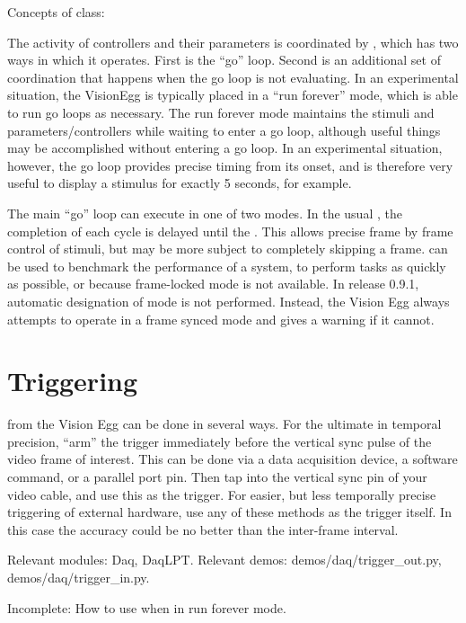 Concepts of  class:

The activity of controllers and their parameters is coordinated by
, which has two ways in which it operates.  First
is the ``go'' loop.  Second is an additional set of coordination that
happens when the go loop is not evaluating. In an experimental
situation, the VisionEgg is typically placed in a ``run forever''
mode, which is able to run go loops as necessary.  The run forever
mode maintains the stimuli and parameters/controllers while waiting to
enter a go loop, although useful things may be accomplished without
entering a go loop.  In an experimental situation, however, the go
loop provides precise timing from its onset, and is therefore very
useful to display a stimulus for exactly 5 seconds, for example.

The main ``go'' loop can execute in one of two modes.  In the usual
, the completion of each cycle is delayed
until the . This allows precise
frame by frame control of stimuli, but may be more subject to
completely skipping a frame.   can be used to
benchmark the performance of a system, to perform tasks as quickly as
possible, or because frame-locked mode is not available. In release
0.9.1, automatic designation of mode is not performed.  Instead, the
Vision Egg always attempts to operate in a frame synced mode and gives
a warning if it cannot.

\section{Triggering}

 from the Vision Egg can be done in
several ways. For the ultimate in temporal precision, ``arm'' the
trigger immediately before the vertical sync pulse of the video frame
of interest. This can be done via a data acquisition device, a
software command, or a parallel port pin. Then tap into the vertical
sync pin of your video cable, and use this as the trigger. For easier,
but less temporally precise triggering of external hardware, use any
of these methods as the trigger itself.  In this case the accuracy
could be no better than the inter-frame interval.

Relevant modules: Daq, DaqLPT.  Relevant demos:
demos/daq/trigger_out.py, demos/daq/trigger_in.py.

 Incomplete: How to use
 when in run forever mode.

